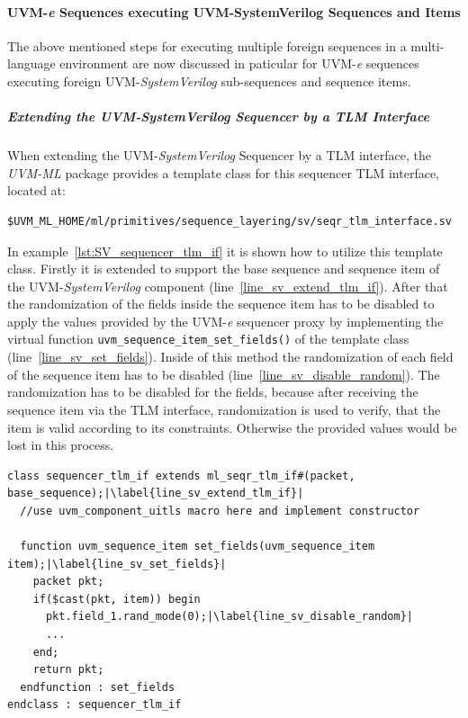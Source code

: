 \paragraph{UVM-\textit{e} Sequences executing UVM-SystemVerilog Sequences and Items}
The above mentioned steps for executing multiple foreign sequences in a multi-language environment are now discussed in paticular for UVM-\textit{e} sequences executing foreign UVM-\emph{SystemVerilog} sub-sequences and sequence items.
\subparagraph{Extending the UVM-SystemVerilog Sequencer by a TLM Interface}
When extending the UVM-\emph{SystemVerilog} Sequencer by a TLM interface, the \emph{UVM-ML} package provides a template class for this sequencer TLM interface, located at:
\smallskip
{}
\begin{lstlisting}
$UVM_ML_HOME/ml/primitives/sequence_layering/sv/seqr_tlm_interface.sv
\end{lstlisting} 
\smallskip
In example~\ref{lst:SV_sequencer_tlm_if} it is shown how to utilize this template class. Firstly it is extended to support the base sequence and sequence item of the UVM-\emph{SystemVerilog} component (line~\ref{line_sv_extend_tlm_if}). After that the randomization of the fields inside the sequence item has to be disabled to apply the values provided by the UVM-\textit{e} sequencer proxy by implementing the virtual function \lstinline$uvm_sequence_item_set_fields()$ of the template class (line~\ref{line_sv_set_fields}). Inside of this method the randomization of each field of the sequence item has to be disabled (line~\ref{line_sv_disable_random}). The randomization has to be disabled for the fields, because after receiving the sequence item via the TLM interface, randomization is used to verify, that the item is valid according to its constraints. Otherwise the provided values would be lost in this process.
\lstset{language=SystemVerilog, numbers = left, escapechar=|, breaklines=true}
\begin{lstlisting}[frame=htrbl, caption={SystemVerilog: creating the TLM interface for the sequencer},
label={lst:SV_sequencer_tlm_if}]
class sequencer_tlm_if extends ml_seqr_tlm_if#(packet, base_sequence);|\label{line_sv_extend_tlm_if}|
  //use uvm_component_uitls macro here and implement constructor

  function uvm_sequence_item set_fields(uvm_sequence_item item);|\label{line_sv_set_fields}|
    packet pkt;   
    if($cast(pkt, item)) begin
      pkt.field_1.rand_mode(0);|\label{line_sv_disable_random}|
      ...
    end;
    return pkt;      
  endfunction : set_fields
endclass : sequencer_tlm_if
\end{lstlisting}
